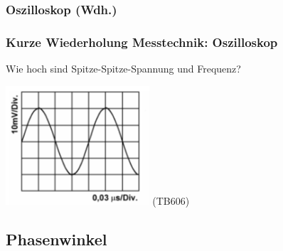 \subsubsection{Oszilloskop (Wdh.)}
 
\begin{frame}
    \frametitle{Kurze Wiederholung Messtechnik: Oszilloskop}


    \begin{block}{
        Wie hoch sind Spitze-Spitze-Spannung und Frequenz?
        \begin{center}
            \includegraphics[width=0.4\textwidth]{a11/TB605.png}
            \tiny (TB606)
        \end{center}
    }
    \end{block}

\end{frame}
   
\subsection{Phasenwinkel}

